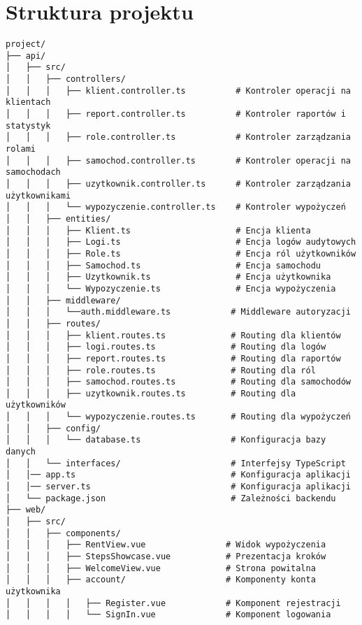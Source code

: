 \documentclass[12pt]{article}
\begin{document}
\section{Struktura projektu}

\begin{verbatim}
project/
├── api/
│   ├── src/
│   │   ├── controllers/
│   │   │   ├── klient.controller.ts          # Kontroler operacji na klientach
│   │   │   ├── report.controller.ts          # Kontroler raportów i statystyk
│   │   │   ├── role.controller.ts            # Kontroler zarządzania rolami
│   │   │   ├── samochod.controller.ts        # Kontroler operacji na samochodach
│   │   │   ├── uzytkownik.controller.ts      # Kontroler zarządzania użytkownikami
│   │   │   └── wypozyczenie.controller.ts    # Kontroler wypożyczeń
│   │   ├── entities/
│   │   │   ├── Klient.ts                     # Encja klienta
│   │   │   ├── Logi.ts                       # Encja logów audytowych
│   │   │   ├── Role.ts                       # Encja ról użytkowników
│   │   │   ├── Samochod.ts                   # Encja samochodu
│   │   │   ├── Uzytkownik.ts                 # Encja użytkownika
│   │   │   └── Wypozyczenie.ts               # Encja wypożyczenia
│   │   ├── middleware/
│   │   │   └──auth.middleware.ts            # Middleware autoryzacji
│   │   ├── routes/
│   │   │   ├── klient.routes.ts             # Routing dla klientów
│   │   │   ├── logi.routes.ts               # Routing dla logów
│   │   │   ├── report.routes.ts             # Routing dla raportów
│   │   │   ├── role.routes.ts               # Routing dla ról
│   │   │   ├── samochod.routes.ts           # Routing dla samochodów
│   │   │   ├── uzytkownik.routes.ts         # Routing dla użytkowników
│   │   │   └── wypozyczenie.routes.ts       # Routing dla wypożyczeń
│   │   ├── config/
│   │   │   └── database.ts                  # Konfiguracja bazy danych
│   │   └── interfaces/                      # Interfejsy TypeScript 
│   │── app.ts                               # Konfiguracja aplikacji
│   │── server.ts                            # Konfiguracja aplikacji
│   └── package.json                         # Zależności backendu
├── web/
│   ├── src/
│   │   ├── components/
│   │   │   ├── RentView.vue                # Widok wypożyczenia
│   │   │   ├── StepsShowcase.vue           # Prezentacja kroków
│   │   │   ├── WelcomeView.vue             # Strona powitalna
│   │   │   ├── account/                    # Komponenty konta użytkownika
│   │   │   │   ├── Register.vue            # Komponent rejestracji
│   │   │   │   └── SignIn.vue              # Komponent logowania

\end{verbatim}
\end{document}
